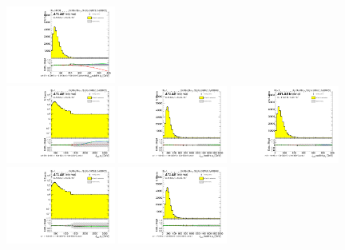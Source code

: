 \begin{figure}[htbp!]
\begin{center}
\includegraphics[angle=270, width=0.32\textwidth]{./figures/boosted/Reweight/Fits/Moriond_bkg_0_NoTag_2Trk_split_lead_Incl_sublHCand_trk1_Pt.pdf} \\
\includegraphics[angle=270, width=0.32\textwidth]{./figures/boosted/Reweight/Fits/Moriond_bkg_3_NoTag_2Trk_split_lead_Incl_sublHCand_Pt_m_1.pdf}
\includegraphics[angle=270, width=0.32\textwidth]{./figures/boosted/Reweight/Fits/Moriond_bkg_3_NoTag_2Trk_split_lead_Incl_sublHCand_trk0_Pt.pdf}
\includegraphics[angle=270, width=0.32\textwidth]{./figures/boosted/Reweight/Fits/Moriond_bkg_3_NoTag_2Trk_split_lead_Incl_sublHCand_trk1_Pt.pdf} \\
\includegraphics[angle=270, width=0.32\textwidth]{./figures/boosted/Reweight/Fits/Moriond_bkg_9_NoTag_2Trk_split_lead_Incl_sublHCand_Pt_m_1.pdf}
\includegraphics[angle=270, width=0.32\textwidth]{./figures/boosted/Reweight/Fits/Moriond_bkg_9_NoTag_2Trk_split_lead_Incl_sublHCand_trk0_Pt.pdf}

\end{center}
\end{figure}
